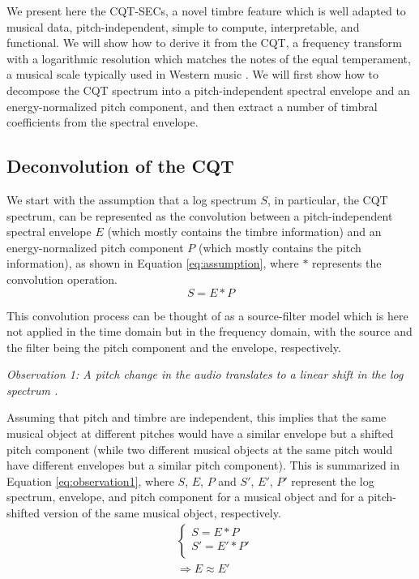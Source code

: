 \documentclass[journal]{IEEEtran}
\begin{document}
We present here the CQT-SECs, a novel timbre feature which is well adapted to musical data, pitch-independent, simple to compute, interpretable, and functional. We will show how to derive it from the CQT, a frequency transform with a logarithmic resolution which matches the notes of the equal temperament, a musical scale typically used in Western music \cite{brown1991, brown1992}. We will first show how to decompose the CQT spectrum into a pitch-independent spectral envelope and an energy-normalized pitch component, and then extract a number of timbral coefficients from the spectral envelope. 

\subsection{Deconvolution of the CQT}

We start with the assumption that a log spectrum $S$, in particular, the CQT spectrum, can be represented as the convolution between a pitch-independent spectral envelope $E$ (which mostly contains the timbre information) and an energy-normalized pitch component $P$ (which mostly contains the pitch information), as shown in Equation \ref{eq:assumption}, where $*$ represents the convolution operation. 
\begin{equation}
\label{eq:assumption}
S = E * P
\end{equation}

This convolution process can be thought of as a source-filter model \cite{fant1970} which is here not applied in the time domain but in the frequency domain, with the source and the filter being the pitch component and the envelope, respectively.

\emph{Observation 1: A pitch change in the audio translates to a linear shift in the log spectrum \cite{brown1991, brown1992}.}

Assuming that pitch and timbre are independent, this implies that the same musical object at different pitches would have a similar envelope but a shifted pitch component (while two different musical objects at the same pitch would have different envelopes but a similar pitch component). This is summarized in Equation \ref{eq:observation1}, where $S$, $E$, $P$ and $S'$, $E'$, $P'$ represent the log spectrum, envelope, and pitch component for a musical object and for a pitch-shifted version of the same musical object, respectively.
\begin{equation}
\label{eq:observation1}
\begin{split}
& \begin{cases}
S = E * P \\
S' = E' * P' \\
\end{cases} \\
& \Rightarrow E \approx E'
\end{split}
\end{equation}
\end{document}
